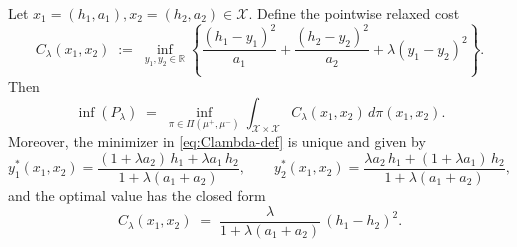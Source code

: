 \documentclass[11pt]{article}
\begin{document}
\begin{proposition}\label{prop:relaxed_reduction}
Let $x_1=(h_1,a_1),x_2=(h_2,a_2)\in\mathcal X$. Define the pointwise relaxed cost
\begin{equation}\label{eq:Clambda-def}
C_\lambda(x_1,x_2)
\;:=\;
\inf_{y_1,y_2\in\mathbb R}
\left\{
\frac{(h_1-y_1)^2}{a_1}+\frac{(h_2-y_2)^2}{a_2}+\lambda (y_1-y_2)^2
\right\}.
\end{equation}
Then
\begin{equation}\label{eq:OT-reduced}
\inf (P_\lambda)
\;=\;
\inf_{\pi\in\Pi(\mu^+,\mu^-)} \int_{\mathcal X\times\mathcal X} C_\lambda(x_1,x_2)\,d\pi(x_1,x_2).
\end{equation}
Moreover, the minimizer in \eqref{eq:Clambda-def} is unique and given by
\begin{equation}\label{eq:y-star}
y_1^*(x_1,x_2)=\frac{(1+\lambda a_2)\,h_1+\lambda a_1\,h_2}{1+\lambda(a_1+a_2)},
\qquad
y_2^*(x_1,x_2)=\frac{\lambda a_2\,h_1+(1+\lambda a_1)\,h_2}{1+\lambda(a_1+a_2)},
\end{equation}
and the optimal value has the closed form
\begin{equation}\label{eq:Clambda-closed}
C_\lambda(x_1,x_2)
\;=\;
\frac{\lambda}{1+\lambda(a_1+a_2)}\,(h_1-h_2)^2.
\end{equation}
\end{proposition}
\end{document}
